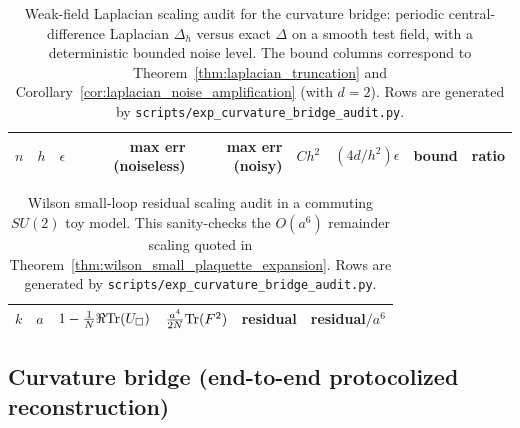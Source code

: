 \begin{table}[H]
\centering
\scriptsize
\setlength{\tabcolsep}{6pt}
\renewcommand{\arraystretch}{1.15}
\begin{tabular}{r r r r r r r r r}
\toprule
$n$ & $h$ & $\epsilon$ & max err (noiseless) & max err (noisy) & $C h^2$ & $(4d/h^2)\epsilon$ & bound & ratio \\
\midrule
%
\end{tabular}
\caption{Weak-field Laplacian scaling audit for the curvature bridge: periodic central-difference Laplacian $\Delta_h$ versus exact $\Delta$ on a smooth test field, with a deterministic bounded noise level. The bound columns correspond to Theorem~\ref{thm:laplacian_truncation} and Corollary~\ref{cor:laplacian_noise_amplification} (with $d=2$). Rows are generated by \texttt{scripts/exp\_curvature\_bridge\_audit.py}.}
\label{tab:curvature_bridge_weak_field}
\end{table}



\begin{table}[H]
\centering
\scriptsize
\setlength{\tabcolsep}{6pt}
\renewcommand{\arraystretch}{1.15}
\begin{tabular}{r r r r r r}
\toprule
$k$ & $a$ & $1-\frac{1}{N}\Re\mathrm{Tr}(U_\square)$ & $\frac{a^4}{2N}\mathrm{Tr}(F^2)$ & residual & residual$/a^6$ \\
\midrule
%
\end{tabular}
\caption{Wilson small-loop residual scaling audit in a commuting $SU(2)$ toy model. This sanity-checks the $O(a^6)$ remainder scaling quoted in Theorem~\ref{thm:wilson_small_plaquette_expansion}. Rows are generated by \texttt{scripts/exp\_curvature\_bridge\_audit.py}.}
\label{tab:curvature_bridge_wilson}
\end{table}

\subsection{Curvature bridge (end-to-end protocolized reconstruction)}



